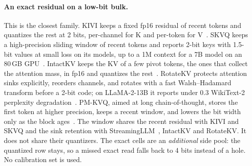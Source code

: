\documentclass[10pt,twocolumn]{article}
\begin{document}
\paragraph{An exact residual on a low-bit bulk.}
This is the closest family. KIVI keeps a fixed fp16 residual of recent tokens and quantizes the rest at 2 bits, per-channel for K and per-token for V~\cite{kivi}. SKVQ keeps a high-precision sliding window of recent tokens and reports 2-bit keys with 1.5-bit values at small loss on its models, up to a 1M context for a 7B model on an 80\,GB GPU~\cite{skvq}. IntactKV keeps the KV of a few pivot tokens, the ones that collect the attention mass, in fp16 and quantizes the rest~\cite{intactkv}. RotateKV protects attention sinks explicitly, reorders channels, and rotates with a fast Walsh--Hadamard transform before a 2-bit code; on LLaMA-2-13B it reports under 0.3 WikiText-2 perplexity degradation~\cite{rotatekv}. PM-KVQ, aimed at long chain-of-thought, stores the first token at higher precision, keeps a recent window, and lowers the bit width only as the block ages~\cite{pmkvq}. The window shares the recent residual with KIVI and SKVQ and the sink retention with StreamingLLM~\cite{streamingllm}, IntactKV and RotateKV. It does not share their quantizers. The exact cells are an \emph{additional} side pool: the quantized row stays, so a missed exact read falls back to 4 bits instead of a hole. No calibration set is used.
\end{document}
